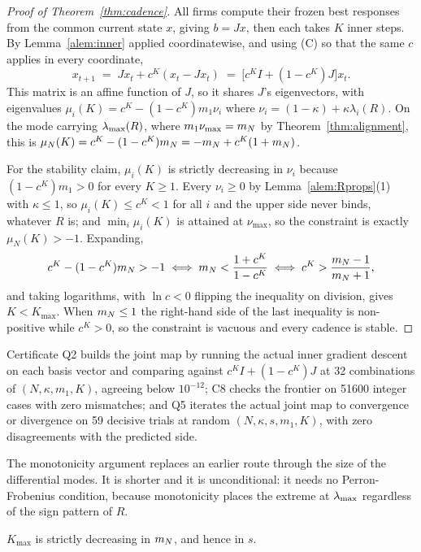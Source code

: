 \begin{proof}[Proof of Theorem~\ref{thm:cadence}]
All firms compute their frozen best responses from the common current state $x$, giving $b = Jx$, then each takes $K$ inner steps. By Lemma~\ref{alem:inner} applied coordinatewise, and using (C) so that the same $c$ applies in every coordinate,
\[
  x_{t+1} \;=\; Jx_t + c^K(x_t - Jx_t) \;=\; \big[c^K I + (1-c^K)J\big]x_t .
\]
This matrix is an affine function of $J$, so it shares $J$'s eigenvectors, with eigenvalues $\mu_i(K) = c^K - (1-c^K)m_1\nu_i$ where $\nu_i = (1-\kappa)+\kappa\lambda_i(R)$. On the mode carrying $\lambda_{\max}(R)$, where $m_1\nu_{\max} = m_N$ by Theorem~\ref{thm:alignment}, this is $\mu_N(K) = c^K - (1-c^K)m_N = -m_N + c^K(1+m_N)$.

For the stability claim, $\mu_i(K)$ is strictly decreasing in $\nu_i$ because $(1-c^K)m_1 > 0$ for every $K \geq 1$. Every $\nu_i \geq 0$ by Lemma~\ref{alem:Rprops}(1) with $\kappa \leq 1$, so $\mu_i(K) \leq c^K < 1$ for all $i$ and the upper side never binds, whatever $R$ is; and $\min_i \mu_i(K)$ is attained at $\nu_{\max}$, so the constraint is exactly $\mu_N(K) > -1$. Expanding,
\[
  c^K - (1-c^K)m_N > -1
  \iff m_N < \frac{1+c^K}{1-c^K}
  \iff c^K > \frac{m_N-1}{m_N+1},
\]
and taking logarithms, with $\ln c < 0$ flipping the inequality on division, gives $K < K_{\max}$. When $m_N \leq 1$ the right-hand side of the last inequality is non-positive while $c^K > 0$, so the constraint is vacuous and every cadence is stable.
\end{proof}

Certificate Q2 builds the joint map by running the actual inner gradient descent on each basis vector and comparing against $c^KI + (1-c^K)J$ at 32 combinations of $(N,\kappa,m_1,K)$, agreeing below $10^{-12}$; C8 checks the frontier on 51600 integer cases with zero mismatches; and Q5 iterates the actual joint map to convergence or divergence on 59 decisive trials at random $(N,\kappa,s,m_1,K)$, with zero disagreements with the predicted side.

The monotonicity argument replaces an earlier route through the size of the differential modes. It is shorter and it is unconditional: it needs no Perron-Frobenius condition, because monotonicity places the extreme at $\lambda_{\max}$ regardless of the sign pattern of $R$.

\begin{acorollary}
\label{acor:kmono}
$K_{\max}$ is strictly decreasing in $m_N$, and hence in $s$.
\end{acorollary}

